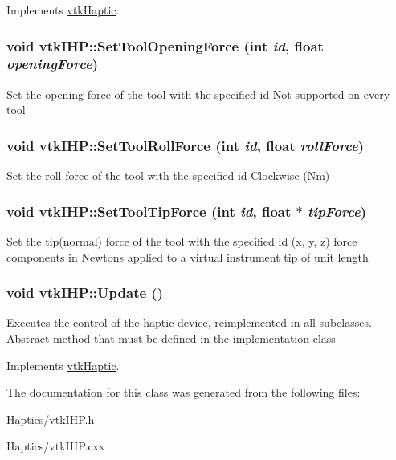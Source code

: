 Implements \hyperlink{classvtkHaptic_a164a353869ace1e3b359da03ce873066}{vtkHaptic}.\hypertarget{classvtkIHP_adabfef75bc93fcf73418614a448943ad}{
\subsubsection[{SetToolOpeningForce}]{\setlength{\rightskip}{0pt plus 5cm}void vtkIHP::SetToolOpeningForce (int {\em id}, \/  float {\em openingForce})}}
\label{classvtkIHP_adabfef75bc93fcf73418614a448943ad}
Set the opening force of the tool with the specified id Not supported on every tool \hypertarget{classvtkIHP_a150baa776fc4adb50fb672a15ac00ee5}{
\subsubsection[{SetToolRollForce}]{\setlength{\rightskip}{0pt plus 5cm}void vtkIHP::SetToolRollForce (int {\em id}, \/  float {\em rollForce})}}
\label{classvtkIHP_a150baa776fc4adb50fb672a15ac00ee5}
Set the roll force of the tool with the specified id Clockwise (Nm) \hypertarget{classvtkIHP_a6d991672b0fa06861ecc7e7efcfd5b98}{
\subsubsection[{SetToolTipForce}]{\setlength{\rightskip}{0pt plus 5cm}void vtkIHP::SetToolTipForce (int {\em id}, \/  float $\ast$ {\em tipForce})}}
\label{classvtkIHP_a6d991672b0fa06861ecc7e7efcfd5b98}
Set the tip(normal) force of the tool with the specified id (x, y, z) force components in Newtons applied to a virtual instrument tip of unit length \hypertarget{classvtkIHP_a0777ce95f933e80ccfb47f4ebadcf1ec}{
\subsubsection[{Update}]{\setlength{\rightskip}{0pt plus 5cm}void vtkIHP::Update ()}}
\label{classvtkIHP_a0777ce95f933e80ccfb47f4ebadcf1ec}


Executes the control of the haptic device, reimplemented in all subclasses. Abstract method that must be defined in the implementation class 

Implements \hyperlink{classvtkHaptic_ae05171fc9104c679ebd3bad356104fdb}{vtkHaptic}.

The documentation for this class was generated from the following files:\begin{DoxyCompactItemize}
\item 
Haptics/vtkIHP.h\item 
Haptics/vtkIHP.cxx\end{DoxyCompactItemize}
